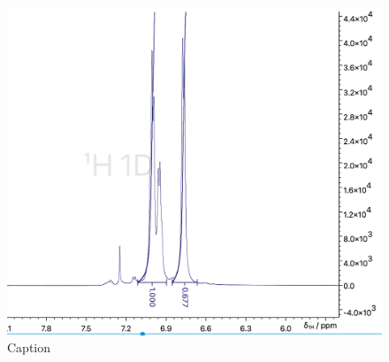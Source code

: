\begin{figure}
    \centering
    \includegraphics[width=0.8\linewidth]{Relazione/foto/CoH_aromaticpeak_right.png}
    \caption{Caption}
    \label{fig:my_label}
\end{figure}


